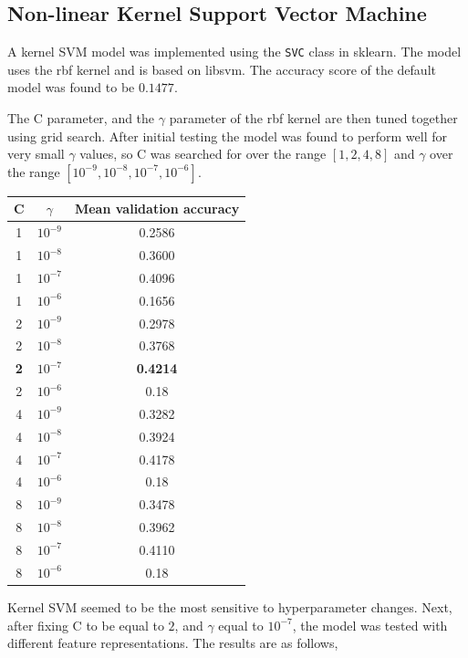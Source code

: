 \documentclass[12pt]{article}
\begin{document}
\subsection*{Non-linear Kernel Support Vector Machine}

A kernel SVM model was implemented using the \texttt{SVC} class in sklearn. The model uses the rbf kernel and is based on libsvm. The accuracy score of the default model was found to be $0.1477$.

The C parameter, and the $\gamma$ parameter of the rbf kernel are then tuned together using grid search. After initial testing the model was found to perform well for very small $\gamma$ values, so C was searched for over the range $[1,2,4,8]$ and $\gamma$ over the range $[10^{-9},10^{-8},10^{-7},10^{-6}]$.

\begin{center}
 \begin{longtable}{|c|c|c|}
  \hline
  C & $\gamma$ & Mean validation accuracy \\
  \hline
  1 & $10^{-9}$ & 0.2586\\
  1 & $10^{-8}$ & 0.3600\\
  1 & $10^{-7}$ & 0.4096\\
  1 & $10^{-6}$ & 0.1656\\
  2 & $10^{-9}$ & 0.2978\\
  2 & $10^{-8}$ & 0.3768\\
  \textbf{2} & \textbf{$10^{-7}$} & \textbf{0.4214}\\
  2 & $10^{-6}$ & 0.18\\
  4 & $10^{-9}$ & 0.3282\\
  4 & $10^{-8}$ & 0.3924\\
  4 & $10^{-7}$ & 0.4178\\
  4 & $10^{-6}$ & 0.18\\
  8 & $10^{-9}$ & 0.3478\\
  8 & $10^{-8}$ & 0.3962\\
  8 & $10^{-7}$ & 0.4110\\
  8 & $10^{-6}$ & 0.18\\
  \hline
 \end{longtable}

\end{center}

Kernel SVM seemed to be the most sensitive to hyperparameter changes. Next, after fixing C to be equal to $2$, and $\gamma$ equal to $10^{-7}$, the model was tested with different feature representations. The results are as follows,
\end{document}

